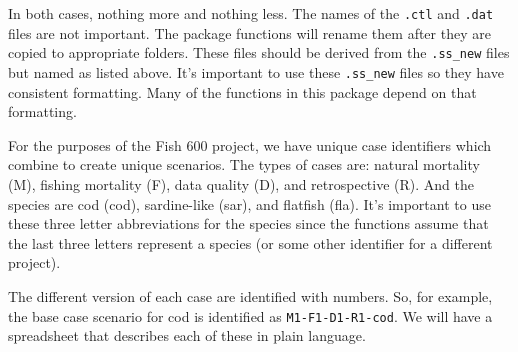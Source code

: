 \documentclass[12pt]{article}
\begin{document}

\noindent
In both cases, nothing more and nothing less. The names of the \texttt{.ctl} 
and \texttt{.dat} files are not important. The package functions will rename 
them after they are copied to appropriate folders. These files should be 
derived from the \texttt{.ss\_new} files but named as listed above. It's 
important to use these \texttt{.ss\_new} files so they have consistent 
formatting. Many of the functions in this package depend on that formatting.

For the purposes of the Fish 600 project, we have unique case identifiers which 
combine to create unique scenarios. The types of cases are: natural mortality 
(M), fishing mortality (F), data quality (D), and retrospective (R). And the 
species are cod (cod), sardine-like (sar), and flatfish (fla). It's important 
to use these three letter abbreviations for the species since the functions 
assume that the last three letters represent a species (or some other 
identifier for a different project).

The different version of each case are identified with numbers. So, for 
example, the base case scenario for cod is identified as 
\texttt{M1-F1-D1-R1-cod}. We will have a spreadsheet that describes each of 
these in plain language.






\end{document}

